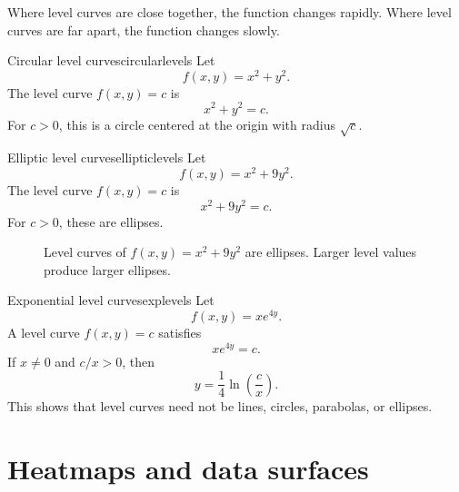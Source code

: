 \documentclass[11pt]{article}
\begin{document}
\begin{tipbox}
Where level curves are close together, the function changes rapidly. Where level curves are far apart, the function changes slowly.
\end{tipbox}

\begin{workedexample}{Circular level curves}{circularlevels}
Let
\[
f(x,y)=x^2+y^2.
\]
The level curve $f(x,y)=c$ is
\[
x^2+y^2=c.
\]
For $c>0$, this is a circle centered at the origin with radius $\sqrt{c}$.
\end{workedexample}

\begin{workedexample}{Elliptic level curves}{ellipticlevels}
Let
\[
f(x,y)=x^2+9y^2.
\]
The level curve $f(x,y)=c$ is
\[
x^2+9y^2=c.
\]
For $c>0$, these are ellipses.
\end{workedexample}

\begin{figure}[H]
\centering
{}
\caption{Level curves of $f(x,y)=x^2+9y^2$ are ellipses. Larger level values produce larger ellipses.}
\end{figure}

\begin{workedexample}{Exponential level curves}{explevels}
Let
\[
f(x,y)=xe^{4y}.
\]
A level curve $f(x,y)=c$ satisfies
\[
xe^{4y}=c.
\]
If $x\ne 0$ and $c/x>0$, then
\[
y=\frac14\ln\!\left(\frac{c}{x}\right).
\]
This shows that level curves need not be lines, circles, parabolas, or ellipses.
\end{workedexample}

\section{Heatmaps and data surfaces}
\end{document}
